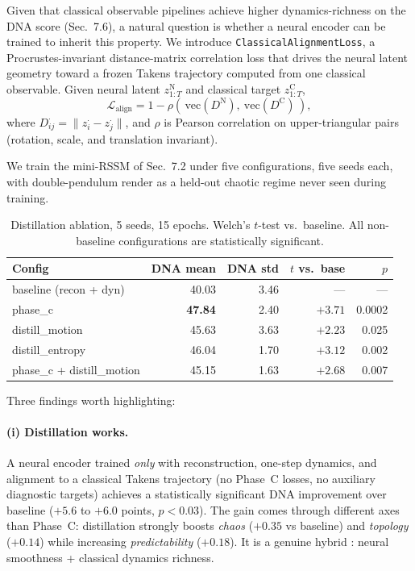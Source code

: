 \documentclass[11pt,a4paper]{article}
\begin{document}
Given that classical observable pipelines achieve higher
dynamics-richness on the DNA score (Sec.~7.6), a natural question is
whether a neural encoder can be trained to inherit this property. We
introduce \texttt{ClassicalAlignmentLoss}, a Procrustes-invariant
distance-matrix correlation loss that drives the neural latent
geometry toward a frozen Takens trajectory computed from one
classical observable. Given neural latent $z^{\text{N}}_{1:T}$ and
classical target $z^{\text{C}}_{1:T}$,
$$\mathcal{L}_{\text{align}} = 1 - \rho\!\left(\,\mathrm{vec}(D^{\text{N}}),\ \mathrm{vec}(D^{\text{C}})\,\right),$$
where $D^{\cdot}_{ij}=\|z^{\cdot}_i - z^{\cdot}_j\|$, and $\rho$ is
Pearson correlation on upper-triangular pairs (rotation, scale, and
translation invariant).

We train the mini-RSSM of Sec.~7.2 under five configurations, five
seeds each, with double-pendulum render as a held-out chaotic regime
never seen during training.

\begin{table}[h]
\centering
\caption{Distillation ablation, 5 seeds, 15 epochs. Welch's
$t$-test vs.\ baseline. All non-baseline configurations are
statistically significant.}
\label{tab:distillation}
\begin{tabular}{lrrrr}
\toprule
Config & DNA mean & DNA std & $t$ vs.\ base & $p$ \\
\midrule
baseline (recon + dyn) & 40.03 & 3.46 & --- & --- \\
phase\_c & \textbf{47.84} & 2.40 & $+3.71$ & 0.0002 \\
distill\_motion & 45.63 & 3.63 & $+2.23$ & 0.025 \\
distill\_entropy & 46.04 & 1.70 & $+3.12$ & 0.002 \\
phase\_c + distill\_motion & 45.15 & 1.63 & $+2.68$ & 0.007 \\
\bottomrule
\end{tabular}
\end{table}

Three findings worth highlighting:

\paragraph{(i) Distillation works.} A neural encoder trained
\emph{only} with reconstruction, one-step dynamics, and alignment to
a classical Takens trajectory (no Phase~C losses, no auxiliary
diagnostic targets) achieves a statistically significant DNA
improvement over baseline ($+5.6$ to $+6.0$ points, $p<0.03$). The
gain comes through different axes than Phase~C: distillation
strongly boosts \emph{chaos} ($+0.35$ vs baseline) and \emph{topology}
($+0.14$) while increasing \emph{predictability} ($+0.18$). It is a
genuine hybrid : neural smoothness + classical dynamics richness.
\end{document}
